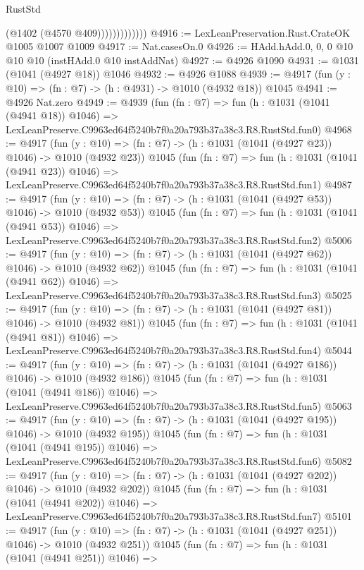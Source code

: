 \begin{lexlean}{RustStd}
\begin{coremodule}
                          (@1402 (@4570 @409)))))))))))))
@4916 := LexLeanPreservation.Rust.CrateOK @1005 @1007 @1009
@4917 := Nat.casesOn.{0}
@4926 := HAdd.hAdd.{0, 0, 0} @10 @10 @10 (instHAdd.{0} @10 instAddNat)
@4927 := @4926 @1090
@4931 := @1031 (@1041 (@4927 @18)) @1046
@4932 := @4926 @1088
@4939 := @4917 (fun (y : @10) => (fn : @7) -> (h : @4931) -> @1010 (@4932 @18)) @1045
@4941 := @4926 Nat.zero
@4949 := @4939
    (fun (fn : @7) =>
    fun (h : @1031 (@1041 (@4941 @18)) @1046) =>
    LexLeanPreserve.C9963ed64f5240b7f0a20a793b37a38c3.R8.RustStd.fun0)
@4968 := @4917
    (fun (y : @10) => (fn : @7) -> (h : @1031 (@1041 (@4927 @23)) @1046) -> @1010 (@4932 @23))
    @1045
    (fun (fn : @7) =>
    fun (h : @1031 (@1041 (@4941 @23)) @1046) =>
    LexLeanPreserve.C9963ed64f5240b7f0a20a793b37a38c3.R8.RustStd.fun1)
@4987 := @4917
    (fun (y : @10) => (fn : @7) -> (h : @1031 (@1041 (@4927 @53)) @1046) -> @1010 (@4932 @53))
    @1045
    (fun (fn : @7) =>
    fun (h : @1031 (@1041 (@4941 @53)) @1046) =>
    LexLeanPreserve.C9963ed64f5240b7f0a20a793b37a38c3.R8.RustStd.fun2)
@5006 := @4917
    (fun (y : @10) => (fn : @7) -> (h : @1031 (@1041 (@4927 @62)) @1046) -> @1010 (@4932 @62))
    @1045
    (fun (fn : @7) =>
    fun (h : @1031 (@1041 (@4941 @62)) @1046) =>
    LexLeanPreserve.C9963ed64f5240b7f0a20a793b37a38c3.R8.RustStd.fun3)
@5025 := @4917
    (fun (y : @10) => (fn : @7) -> (h : @1031 (@1041 (@4927 @81)) @1046) -> @1010 (@4932 @81))
    @1045
    (fun (fn : @7) =>
    fun (h : @1031 (@1041 (@4941 @81)) @1046) =>
    LexLeanPreserve.C9963ed64f5240b7f0a20a793b37a38c3.R8.RustStd.fun4)
@5044 := @4917
    (fun (y : @10) => (fn : @7) -> (h : @1031 (@1041 (@4927 @186)) @1046) -> @1010 (@4932 @186))
    @1045
    (fun (fn : @7) =>
    fun (h : @1031 (@1041 (@4941 @186)) @1046) =>
    LexLeanPreserve.C9963ed64f5240b7f0a20a793b37a38c3.R8.RustStd.fun5)
@5063 := @4917
    (fun (y : @10) => (fn : @7) -> (h : @1031 (@1041 (@4927 @195)) @1046) -> @1010 (@4932 @195))
    @1045
    (fun (fn : @7) =>
    fun (h : @1031 (@1041 (@4941 @195)) @1046) =>
    LexLeanPreserve.C9963ed64f5240b7f0a20a793b37a38c3.R8.RustStd.fun6)
@5082 := @4917
    (fun (y : @10) => (fn : @7) -> (h : @1031 (@1041 (@4927 @202)) @1046) -> @1010 (@4932 @202))
    @1045
    (fun (fn : @7) =>
    fun (h : @1031 (@1041 (@4941 @202)) @1046) =>
    LexLeanPreserve.C9963ed64f5240b7f0a20a793b37a38c3.R8.RustStd.fun7)
@5101 := @4917
    (fun (y : @10) => (fn : @7) -> (h : @1031 (@1041 (@4927 @251)) @1046) -> @1010 (@4932 @251))
    @1045
    (fun (fn : @7) =>
    fun (h : @1031 (@1041 (@4941 @251)) @1046) =>

\end{coremodule}
\end{lexlean}
